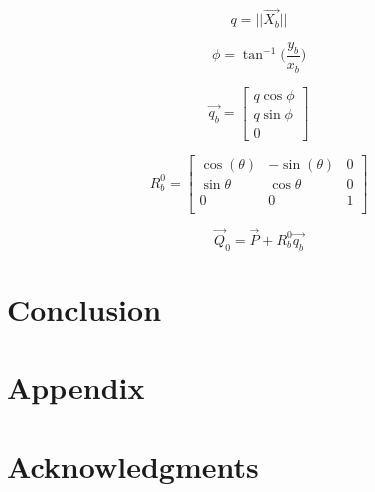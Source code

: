 \documentclass[conf]{new-aiaa}
\begin{document}
\begin{equation}
\label{eq:pos}
q = ||\overrightarrow{X_b}||
\end{equation}

\begin{equation}
\label{eq:pos}
\phi = \tan^{-1} \bigg( \frac{y_b}{x_b} \bigg)
\end{equation}

\begin{equation}
\label{eq:pos}
\overrightarrow{q_b} = \begin{bmatrix}
	q\cos\phi \\
	q\sin\phi \\
	0
\end{bmatrix}
\end{equation}

\begin{equation}
\label{eq:pos}
   R^0_b=\begin{bmatrix}
	\cos(\theta) & -\sin(\theta) & 0 \\
	\sin\theta & \cos\theta & 0 \\
	0 & 0 & 1 \\
\end{bmatrix}
\end{equation}


\begin{equation}
\label{eq:pos}
\overrightarrow{Q}_0 = \overrightarrow{P} + R^0_b  \overrightarrow{q_b}
\end{equation}
















\section{Conclusion}



\section*{Appendix}



\section*{Acknowledgments}


\end{document}
